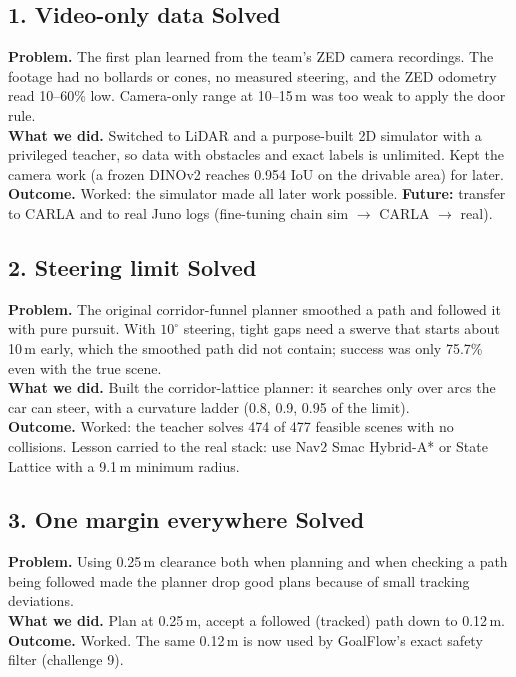 \documentclass[11pt,a4paper]{article}
\newcommand{\solved}{\textcolor{okc}{\textbf{Solved}}}
\begin{document}
\subsection*{1. Video-only data \hfill\solved}
\textbf{Problem.} The first plan learned from the team's ZED camera recordings. The footage had no bollards or
cones, no measured steering, and the ZED odometry read 10--60\% low. Camera-only range at 10--15\,m was too
weak to apply the door rule.\\
\textbf{What we did.} Switched to LiDAR and a purpose-built 2D simulator with a privileged teacher, so data
with obstacles and exact labels is unlimited. Kept the camera work (a frozen DINOv2 reaches 0.954 IoU on the
drivable area) for later.\\
\textbf{Outcome.} Worked: the simulator made all later work possible. \textbf{Future:} transfer to CARLA and to
real Juno logs (fine-tuning chain sim $\to$ CARLA $\to$ real).

\subsection*{2. Steering limit \hfill\solved}
\textbf{Problem.} The original corridor-funnel planner smoothed a path and followed it with pure pursuit. With
$10^\circ$ steering, tight gaps need a swerve that starts about 10\,m early, which the smoothed path did not
contain; success was only 75.7\% even with the true scene.\\
\textbf{What we did.} Built the corridor-lattice planner: it searches only over arcs the car can steer, with a
curvature ladder (0.8, 0.9, 0.95 of the limit).\\
\textbf{Outcome.} Worked: the teacher solves 474 of 477 feasible scenes with no collisions. Lesson carried to
the real stack: use Nav2 Smac Hybrid-A* or State Lattice with a 9.1\,m minimum radius.

\subsection*{3. One margin everywhere \hfill\solved}
\textbf{Problem.} Using 0.25\,m clearance both when planning and when checking a path being followed made the
planner drop good plans because of small tracking deviations.\\
\textbf{What we did.} Plan at 0.25\,m, accept a followed (tracked) path down to 0.12\,m.\\
\textbf{Outcome.} Worked. The same 0.12\,m is now used by GoalFlow's exact safety filter (challenge 9).
\end{document}
